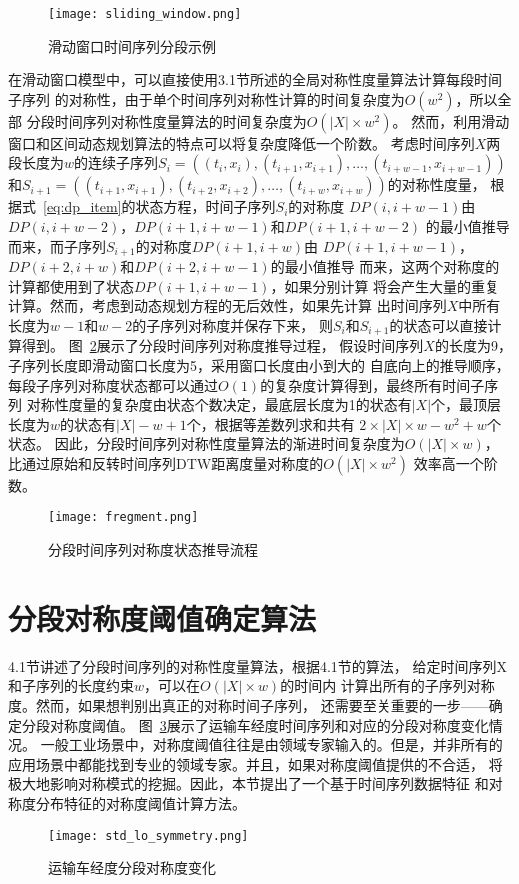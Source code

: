 \begin{figure}
  \centering
  \texttt{[image: sliding\_window.png]}
  \caption{滑动窗口时间序列分段示例}
  \label{fig:sliding_window}
\end{figure}

在滑动窗口模型中，可以直接使用3.1节所述的全局对称性度量算法计算每段时间子序列
的对称性，由于单个时间序列对称性计算的时间复杂度为$O(w^2 )$，所以全部
分段时间序列对称性度量算法的时间复杂度为$O\left(|X| \times w^{2}\right)$。
然而，利用滑动窗口和区间动态规划算法的特点可以将复杂度降低一个阶数。
考虑时间序列$X$两段长度为$w$的连续子序列$S_{i}=\left(\left(t_{i}, x_{i}\right),\left(t_{i+1}, x_{i+1}\right), \dots,\left(t_{i+w-1}, x_{i+w-1}\right)\right)$
和$S_{i+1}=\left(\left(t_{i+1}, x_{i+1}\right),\left(t_{i+2}, x_{i+2}\right), \dots,\left(t_{i+w}, x_{i+w}\right)\right)$的对称性度量，
根据式~\ref{eq:dp_item}的状态方程，时间子序列$S_i$的对称度
$D P(i, i+w-1)$由$DP(i,i+w-2)$，$DP(i+1,i+w-1)$和$DP(i+1,i+w-2)$
的最小值推导而来，而子序列$S_{i+1}$的对称度$D P(i+1, i+w)$由
$D P(i+1, i+w-1)$，$DP(i+2,i+w)$和$DP(i+2,i+w-1)$的最小值推导
而来，这两个对称度的计算都使用到了状态$DP(i+1,i+w-1)$，如果分别计算
将会产生大量的重复计算。然而，考虑到动态规划方程的无后效性，如果先计算
出时间序列$X$中所有长度为$w-1$和$w-2$的子序列对称度并保存下来，
则$S_i$和$S_{i+1}$的状态可以直接计算得到。
图~\ref{fig:fregment}展示了分段时间序列对称度推导过程，
假设时间序列$X$的长度为9，子序列长度即滑动窗口长度为5，采用窗口长度由小到大的
自底向上的推导顺序，每段子序列对称度状态都可以通过$O(1)$的复杂度计算得到，最终所有时间子序列
对称性度量的复杂度由状态个数决定，最底层长度为1的状态有$|X|$个，最顶层
长度为$w$的状态有$|X|-w+1$个，根据等差数列求和共有
$2 \times|X| \times w-w^{2}+w$个状态。
因此，分段时间序列对称性度量算法的渐进时间复杂度为$O(|X| \times w)$，
比通过原始和反转时间序列DTW距离度量对称度的$O\left(|X| \times w^{2}\right)$
效率高一个阶数。
\begin{figure}
  \centering
  \texttt{[image: fregment.png]}
  \caption{分段时间序列对称度状态推导流程}
  \label{fig:fregment}
\end{figure}

\section{分段对称度阈值确定算法}

4.1节讲述了分段时间序列的对称性度量算法，根据4.1节的算法，
给定时间序列X和子序列的长度约束$w$，可以在$O(|X| \times w)$的时间内
计算出所有的子序列对称度。然而，如果想判别出真正的对称时间子序列，
还需要至关重要的一步——确定分段对称度阈值。
图~\ref{fig:lontitude_symmetry}展示了运输车经度时间序列和对应的分段对称度变化情况。
一般工业场景中，对称度阈值往往是由领域专家输入的。但是，并非所有的
应用场景中都能找到专业的领域专家。并且，如果对称度阈值提供的不合适，
将极大地影响对称模式的挖掘。因此，本节提出了一个基于时间序列数据特征
和对称度分布特征的对称度阈值计算方法。
\begin{figure}
  \centering
  \texttt{[image: std\_lo\_symmetry.png]}
  \caption{运输车经度分段对称度变化}
  \label{fig:lontitude_symmetry}
\end{figure}

